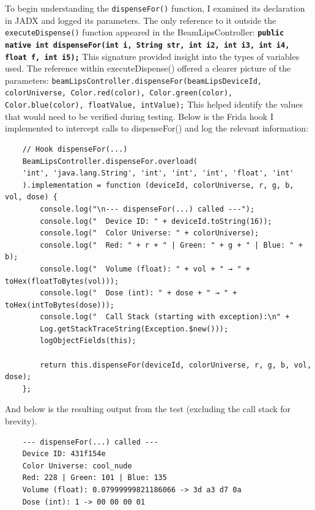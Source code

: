 To begin understanding the \texttt{dispenseFor()} function, I examined its declaration in JADX and logged its parameters. The only reference to it outside the \texttt{executeDispense()} function appeared in the BeamLipsController: \textbf{\texttt{public native int dispenseFor(int i, String str, int i2, int i3, int i4, float f, int i5);}}
This signature provided insight into the types of variables used. The reference within executeDispense() offered a clearer picture of the parameters: \texttt{beamLipsController.dispenseFor(beamLipsDeviceId, colorUniverse, Color.red(color), Color.green(color), Color.blue(color), floatValue, intValue);}
This helped identify the values that would need to be verified during testing. Below is the Frida hook I implemented to intercept calls to dispenseFor() and log the relevant information:
\begin{verbatim}
	// Hook dispenseFor(...)
	BeamLipsController.dispenseFor.overload(
	'int', 'java.lang.String', 'int', 'int', 'int', 'float', 'int'
	).implementation = function (deviceId, colorUniverse, r, g, b, vol, dose) {
		console.log("\n--- dispenseFor(...) called ---");
		console.log("  Device ID: " + deviceId.toString(16));
		console.log("  Color Universe: " + colorUniverse);
		console.log("  Red: " + r + " | Green: " + g + " | Blue: " + b);
		console.log("  Volume (float): " + vol + " → " + toHex(floatToBytes(vol)));
		console.log("  Dose (int): " + dose + " → " + toHex(intToBytes(dose)));
		console.log("  Call Stack (starting with exception):\n" +
		Log.getStackTraceString(Exception.$new()));
		logObjectFields(this);
		
		return this.dispenseFor(deviceId, colorUniverse, r, g, b, vol, dose);
	};
\end{verbatim}
And below is the resulting output from the test (excluding the call stack for brevity). 
\begin{verbatim}
	--- dispenseFor(...) called ---
	Device ID: 431f154e
	Color Universe: cool_nude
	Red: 228 | Green: 101 | Blue: 135
	Volume (float): 0.07999999821186066 -> 3d a3 d7 0a
	Dose (int): 1 -> 00 00 00 01
\end{verbatim}
